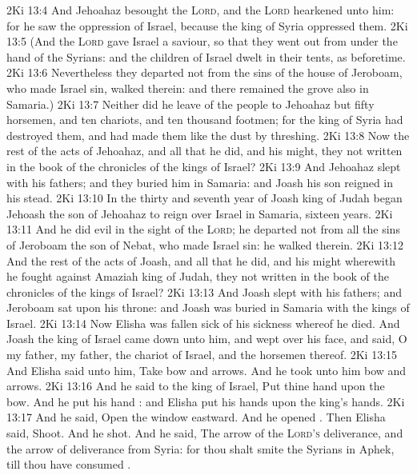 \vs 2Ki 13:4 And Jehoahaz besought the \textsc{Lord}, and the \textsc{Lord} hearkened unto him: for he saw the oppression of Israel, because the king of Syria oppressed them.
\vs 2Ki 13:5 (And the \textsc{Lord} gave Israel a saviour, so that they went out from under the hand of the Syrians: and the children of Israel dwelt in their tents, as beforetime.
\vs 2Ki 13:6 Nevertheless they departed not from the sins of the house of Jeroboam, who made Israel sin,  walked therein: and there remained the grove also in Samaria.)
\vs 2Ki 13:7 Neither did he leave of the people to Jehoahaz but fifty horsemen, and ten chariots, and ten thousand footmen; for the king of Syria had destroyed them, and had made them like the dust by threshing.
\vs 2Ki 13:8 Now the rest of the acts of Jehoahaz, and all that he did, and his might,  they not written in the book of the chronicles of the kings of Israel?
\vs 2Ki 13:9 And Jehoahaz slept with his fathers; and they buried him in Samaria: and Joash his son reigned in his stead.
\vs 2Ki 13:10 In the thirty and seventh year of Joash king of Judah began Jehoash the son of Jehoahaz to reign over Israel in Samaria,  sixteen years.
\vs 2Ki 13:11 And he did  evil in the sight of the \textsc{Lord}; he departed not from all the sins of Jeroboam the son of Nebat, who made Israel sin:  he walked therein.
\vs 2Ki 13:12 And the rest of the acts of Joash, and all that he did, and his might wherewith he fought against Amaziah king of Judah,  they not written in the book of the chronicles of the kings of Israel?
\vs 2Ki 13:13 And Joash slept with his fathers; and Jeroboam sat upon his throne: and Joash was buried in Samaria with the kings of Israel.
\vs 2Ki 13:14 Now Elisha was fallen sick of his sickness whereof he died. And Joash the king of Israel came down unto him, and wept over his face, and said, O my father, my father, the chariot of Israel, and the horsemen thereof.
\vs 2Ki 13:15 And Elisha said unto him, Take bow and arrows. And he took unto him bow and arrows.
\vs 2Ki 13:16 And he said to the king of Israel, Put thine hand upon the bow. And he put his hand : and Elisha put his hands upon the king's hands.
\vs 2Ki 13:17 And he said, Open the window eastward. And he opened . Then Elisha said, Shoot. And he shot. And he said, The arrow of the \textsc{Lord's} deliverance, and the arrow of deliverance from Syria: for thou shalt smite the Syrians in Aphek, till thou have consumed .
